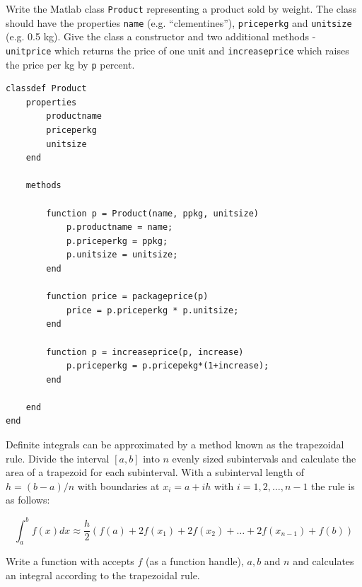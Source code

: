 \documentclass[addpoints]{exam}
\begin{document}
\begin{questions}
\begin{multicols}{2}
\end{multicols}

\newpage

\question[10] Write the Matlab class \texttt{Product} representing a product sold by weight. The class should have the properties \texttt{name} (e.g. ``clementines''), \texttt{priceperkg} and \texttt{unitsize} (e.g. 0.5 kg). Give the class a constructor and two additional methods - \texttt{unitprice} which returns the price of one unit and \texttt{increaseprice} which raises the price per kg by \texttt{p} percent.

\begin{solution}
    
\begin{verbatim}
classdef Product
    properties
        productname
        priceperkg
        unitsize
    end
    
    methods
        
        function p = Product(name, ppkg, unitsize)
            p.productname = name;
            p.priceperkg = ppkg;
            p.unitsize = unitsize;
        end
        
        function price = packageprice(p)
            price = p.priceperkg * p.unitsize;
        end
        
        function p = increaseprice(p, increase)
            p.priceperkg = p.pricepekg*(1+increase);
        end
        
    end
end
\end{verbatim}
   
\end{solution}

\newpage

\question[10] Definite integrals can be approximated by a method known as the trapezoidal rule. Divide the interval $[a,b]$ into $n$ evenly sized subintervals and calculate the area of a trapezoid for each subinterval. With a subinterval length of $h = (b-a)/n$ with boundaries at $x_i=a+ih$ with $i = 1,2,\ldots,n-1$ the rule is as follows:

\[
    \int_a^b f(x) dx \approx \frac{h}{2}\left(f(a) + 2f(x_1) + 2f(x_2) + \ldots + 2f(x_{n-1}) + f(b)\right)
\]

Write a function with accepts $f$ (as a function handle), $a, b$ and $n$ and calculates an integral according to the trapezoidal rule.

\end{questions}
\end{document}
